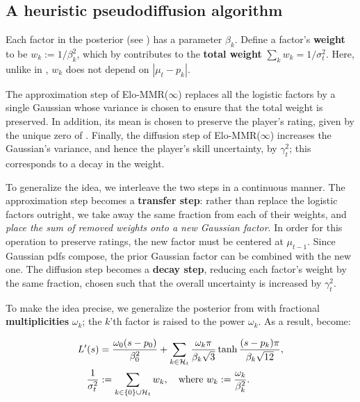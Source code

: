 \subsection{A heuristic pseudodiffusion algorithm}
\label{sec:pseudodiffusion}
Each factor in the posterior (see ) has a parameter $\beta_k$. Define a factor's \textbf{weight} to be $w_k := 1/\beta_k^2$, which by  contributes to the \textbf{total weight} $\sum_k w_k=1/\sigma_t^2$. Here, unlike in , $w_k$ does not depend on $|\mu_t-p_k|$.

The approximation step of Elo-MMR($\infty$) replaces all the logistic factors by a single Gaussian whose variance is chosen to ensure that the total weight is preserved. In addition, its mean is chosen to preserve the player's rating, given by the unique zero of . Finally, the diffusion step of Elo-MMR($\infty$) increases the Gaussian's variance, and hence the player's skill uncertainty, by $\gamma_t^2$; this corresponds to a decay in the weight.

To generalize the idea, we interleave the two steps in a continuous manner. The approximation step becomes a \textbf{transfer step}: rather than replace the logistic factors outright, we take away the same fraction from each of their weights, and \emph{place the sum of removed weights onto a new Gaussian factor}. In order for this operation to preserve ratings, the new factor must be centered at $\mu_{t-1}$. Since Gaussian pdfs compose, the prior Gaussian factor can be combined with the new one. The diffusion step becomes a \textbf{decay step}, reducing each factor's weight by the same fraction, chosen such that the overall uncertainty is increased by $\gamma_t^2$.

To make the idea precise, we generalize the posterior from  with fractional \textbf{multiplicities} $\omega_k$; the $k$'th factor is raised to the power $\omega_k$. As a result,  become:

\begin{align}
\label{eq:multiplicities}
L'(s) &= \frac{\omega_0(s-p_0)}{\beta_0^2} + \sum_{k\in{\mathcal{H}}_t} \frac{\omega_k\pi}{\beta_k\sqrt{3}} \tanh \frac{(s-p_k)\pi}{\beta_k\sqrt{12}},\nonumber
\\\frac{1}{\sigma_t^2} &:= \sum_{k\in\{0\}\cup{\mathcal{H}}_t}w_k,\quad\text{where }w_k := \frac{\omega_k}{\beta_k^2}.
\end{align}

